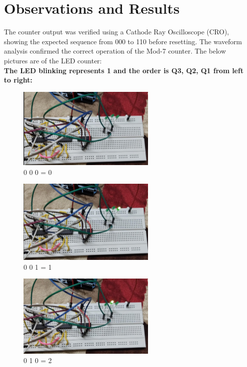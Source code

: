 \documentclass[a4paper,12pt]{article}
\begin{document}
\section{Observations and Results}
The counter output was verified using a Cathode Ray Oscilloscope (CRO), showing the expected sequence from 000 to 110 before resetting. The waveform analysis confirmed the correct operation of the Mod-7 counter.
The below pictures are of the LED counter:\\
\textbf{The LED blinking represents 1 and the order is Q3, Q2, Q1 from left to right:}
\begin{figure}[H]
\centering
\includegraphics[width=0.6\textwidth]{figs/1.jpeg}
\caption*{0 0 0 = 0}
\end{figure}
\begin{figure}[H]
\centering
\includegraphics[width=0.6\textwidth]{figs/2.jpeg}
\caption*{0 0 1 = 1}
\end{figure}
\begin{figure}[H]
\centering
\includegraphics[width=0.6\textwidth]{figs/3.jpeg}
\caption*{0 1 0 = 2}
\end{figure}
\end{document}
